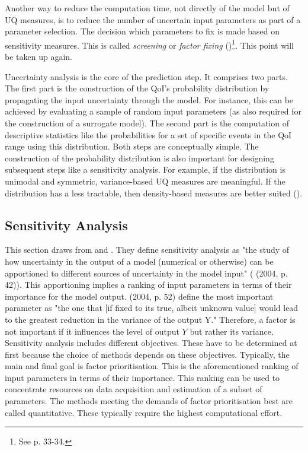 Another way to reduce the computation time, not directly of the model but of UQ measures, is to reduce the number of uncertain input parameters as part of a parameter selection. The decision which parameters to fix is made based on sensitivity measures. This is called \textit{screening} or \textit{factor fixing} (\cite{Saltelli.2008})\footnote{See p. 33-34.}. This point will be taken up again.

Uncertainty analysis is the core of the prediction step. It comprises two parts. The first part is the construction of the QoI's probability distribution by propagating the input uncertainty through the model. For instance, this can be achieved by evaluating a sample of random input parameters (as also required for the construction of a surrogate model). The second part is the computation of descriptive statistics like the probabilities for a set of specific events in the QoI range using this distribution. Both steps are conceptually simple. The construction of the probability distribution is also important for designing subsequent steps like a sensitivity analysis. For example, if the distribution is unimodal and symmetric, variance-based UQ measures are meaningful. If the distribution has a less tractable, then density-based measures are better suited (\cite{plischke2013global}).


\subsection{Sensitivity Analysis}


This section draws from \cite{Saltelli.2004} and \cite{Saltelli.2008}.
They define sensitivity analysis as "the study of how uncertainty in the output of a model (numerical or otherwise) can be apportioned to different sources of uncertainty in the model input" (\citeauthor{Saltelli.2004} (2004, p. 42)). This apportioning implies a ranking of input parameters in terms of their importance for the model output. \citeauthor{Saltelli.2004} (2004, p. 52) define the most important parameter as "the one that [if fixed to its true, albeit unknown value]
would lead to the greatest reduction in the variance of the output Y." Therefore, a factor is not important if it influences the level of output $Y$ but rather its variance.\\

\noindent
Sensitivity analysis includes different objectives. These have to be determined at first because the choice of methods depends on these objectives. Typically, the main and final goal is factor prioritisation. This is the aforementioned ranking of input parameters in terms of their importance. This ranking can be used to concentrate resources on data acquisition and estimation of a subset of parameters. The methods meeting the demands of factor prioritisation best are called quantitative. These typically require the highest computational effort.

